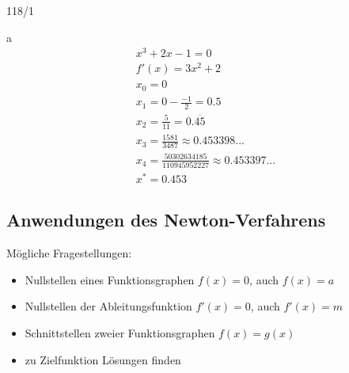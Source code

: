 \begin{exercise}{118/1}
  \item [a]
  \begin{gather*}
    x^3 + 2x - 1 = 0 \\
    f'(x) = 3x^2 + 2 \\
    x_0 = 0 \\
    x_1 = 0 - \frac{-1}{2} = 0.5 \\
    x_2 = \frac{5}{11} = 0.\overline{45} \\
    x_3 = \frac{1581}{3487} \approx 0.453398... \\
    x_4 = \frac{50302634185}{110945952227} \approx 0.453397...\\
    x^\ast = 0.453
  \end{gather*}
\end{exercise}
\subsection{Anwendungen des Newton-Verfahrens}
Mögliche Fragestellungen: \\
\begin{itemize}
  \item Nullstellen eines Funktionsgraphen $f(x) = 0$, auch $f(x) = a$
  \item Nullstellen der Ableitungsfunktion $f'(x) = 0$, auch $f'(x) = m$
  \item Schnittstellen zweier Funktionsgraphen $f(x) = g(x)$
  \item zu Zielfunktion Lösungen finden
\end{itemize}
\newpage
